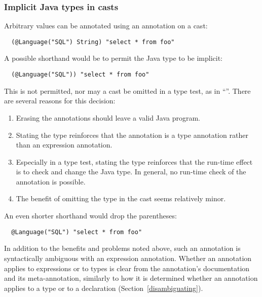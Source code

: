 \documentclass[10pt]{article}
\begin{document}
\subsubsection{Implicit Java types in casts\label{implicit-java-types-in-casts}}

Arbitrary values can be annotated using an annotation on a cast:
\begin{Verbatim}
  (@Language("SQL") String) "select * from foo"
\end{Verbatim}

A possible shorthand would be to permit the Java type to be implicit:
\begin{Verbatim}
  (@Language("SQL")) "select * from foo"
\end{Verbatim}
This is not permitted, nor may a cast be omitted in a type test, as in
``''.  There are several reasons for this
decision:
\begin{enumerate}
\item Erasing the annotations should leave a valid Java program.
\item Stating the type reinforces that the annotation is a
type annotation rather than an expression annotation.
\item Especially in a type test, stating the type reinforces that the run-time
effect is to check and change the Java type.  In general, no run-time check
of the annotation is possible.
\item The benefit of omitting the type in the cast seems relatively minor.
\end{enumerate}

An even shorter shorthand would drop the parentheses:
\begin{Verbatim}
  @Language("SQL") "select * from foo"
\end{Verbatim}
In addition to the benefits and problems noted above, such an annotation is
syntactically ambiguous with an expression annotation.
Whether an annotation applies to expressions or to types is clear from the
annotation's documentation and its  meta-annotation,
similarly to how it is determined whether an annotation applies to a type
or to a declaration (Section~\ref{disambiguating}).

\end{document}
